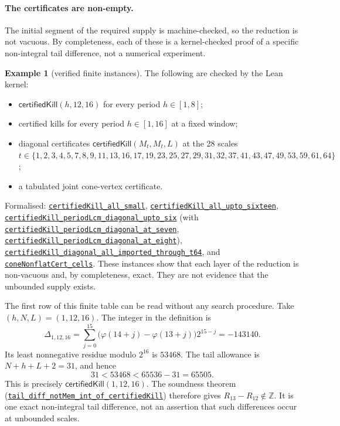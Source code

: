 \documentclass[11pt]{article}
\newcommand{\commit}{81150c1c6fdd4cd51e76d3aa0de344341e0e9e7c}
\newcommand{\repobase}{https://github.com/wcook04/plectis-lean-erdos249-257/blob/\commit}
\newcommand{\PK}{Erdos249257}
\newcommand{\lrefx}[3]{\href{\repobase/\PK/#1\#L#2}{\nolinkurl{#3}}}
\theoremstyle{definition}
\newtheorem{example}[theorem]{Example}
\theoremstyle{remark}
\newcommand{\Z}{\mathbb{Z}}
\newcommand{\ph}{\varphi}
\begin{document}
\paragraph{The certificates are non-empty.} The initial segment of the required
supply is machine-checked, so the reduction is not vacuous. By completeness, each
of these is a kernel-checked proof of a specific non-integral tail difference,
not a numerical experiment.

\begin{example}[verified finite instances]\label{res:deposits}
The following are checked by the Lean kernel:
\begin{itemize}[leftmargin=1.4em]
\item $\textsf{certifiedKill}(h,12,16)$ for every period $h\in[1,8]$;
\item certified kills for every period $h\in[1,16]$ at a fixed window;
\item diagonal certificates $\textsf{certifiedKill}(M_t,M_t,L)$ at the 28 scales
  $t\in\{1,2,3,4,5,7,8,9,11,13,16,17,19,23,25,27,29,31,32,37,41,43,
  47,49,53,59,61,64\}$;
\item a tabulated joint cone-vertex certificate.
\end{itemize}
\end{example}
\noindent Formalised: \lrefx{TotientTailPeriodKiller.lean}{404}{certifiedKill_all_small},
\lrefx{CarrySurvivorExtinction.lean}{574}{certifiedKill_all_upto_sixteen},
\lrefx{LcmDiagonalReduction.lean}{237}{certifiedKill_periodLcm_diagonal_upto_six}
(with \lrefx{LcmDiagonalReduction.lean}{242}{certifiedKill_periodLcm_diagonal_at_seven},
\lrefx{LcmDiagonalReduction.lean}{246}{certifiedKill_periodLcm_diagonal_at_eight}),
\lrefx{DiagonalPincerCertificatesT64.lean}{1967}{certifiedKill_diagonal_all_imported_through_t64},
and \lrefx{LcmConeNonflat.lean}{506}{coneNonflatCert_cells}. These instances show
that each layer of the reduction is non-vacuous and, by completeness, exact. They
are not evidence that the unbounded supply exists.

The first row of this finite table can be read without any search procedure.
Take $(h,N,L)=(1,12,16)$.  The integer in the definition is
\[
 \Delta_{1,12,16}
 =\sum_{j=0}^{15}\bigl(\ph(14+j)-\ph(13+j)\bigr)2^{15-j}
 =-143140.
\]
Its least nonnegative residue modulo $2^{16}$ is $53468$.  The tail allowance
is $N+h+L+2=31$, and hence
\[
       31<53468<65536-31=65505.
\]
This is precisely $\textsf{certifiedKill}(1,12,16)$.  The soundness theorem
(\lrefx{TotientTailPeriodKiller.lean}{262}{tail_diff_notMem_int_of_certifiedKill})
therefore gives $R_{13}-R_{12}\notin\Z$.  It is one exact non-integral tail
difference, not an assertion that such differences occur at unbounded scales.
\end{document}
